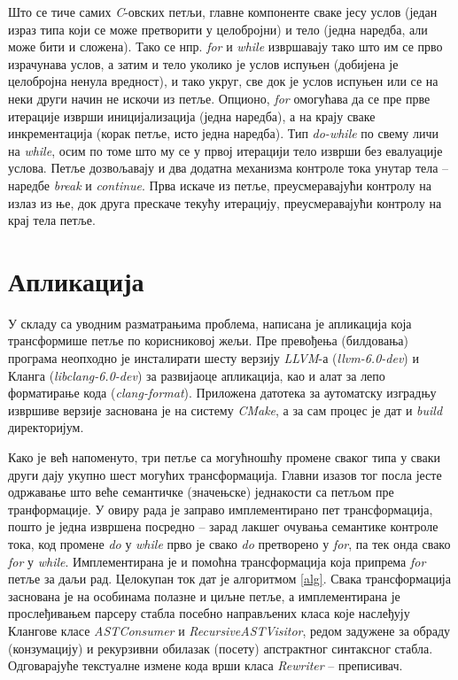 \documentclass[a4paper]{article}
\begin{document}
Што се тиче самих \textit{C}-овских петљи, главне компоненте сваке јесу услов (један израз типа који се може претворити у целобројни) и тело (једна наредба, али може бити и сложена). Тако се нпр. \textit{for} и \textit{while} извршавају тако што им се прво израчунава услов, а затим и тело уколико је услов испуњен (добијена је целобројна ненула вредност), и тако укруг, све док је услов испуњен или се на неки други начин не искочи из петље. Опционо, \textit{for} омогућава да се пре прве итерације изврши иницијализација (једна наредба), а на крају сваке инкрементација (корак петље, исто једна наредба). Тип \textit{do-while} по свему личи на \textit{while}, осим по томе што му се у првој итерацији тело изврши без евалуације услова. Петље дозвољавају и два додатна механизма контроле тока унутар тела -- наредбе \textit{break} и \textit{continue}. Прва искаче из петље, преусмеравајући контролу на излаз из ње, док друга прескаче текућу итерацију, преусмеравајући контролу на крај тела петље.

\section{Апликација}

У складу са уводним разматрањима проблема, написана је апликација која трансформише петље по корисниковој жељи. Пре превођења (билдовања) програма неопходно је инсталирати шесту верзију \textit{LLVM}-а (\textit{llvm-6.0-dev}) и Кланга (\textit{libclang-6.0-dev}) за развијаоце апликација, као и алат за лепо форматирање кода (\textit{clang-format}). Приложена датотека за аутоматску изградњу извршиве верзије заснована је на систему \textit{CMake}, а за сам процес је дат и \textit{build} директоријум.

Како је већ напоменуто, три петље са могућношћу промене сваког типа у сваки други дају укупно шест могућих трансформација. Главни изазов тог посла јесте одржавање што веће семантичке (значењске) једнакости са петљом пре транформације. У овиру рада је заправо имплементирано пет трансформација, пошто је једна извршена посредно -- зарад лакшег очувања семантике контроле тока, код промене \textit{do} у \textit{while} прво је свако \textit{do} претворено у \textit{for}, па тек онда свако \textit{for} у \textit{while}. Имплементирана је и помоћна трансформација која припрема \textit{for} петље за даљи рад. Целокупан ток дат је алгоритмом \ref{alg}. Свака трансформација заснована је на особинама полазне и циљне петље, а имплементирана је прослеђивањем парсеру стабла посебно направљених класа које наслеђују Клангове класе \textit{ASTConsumer} и \textit{RecursiveASTVisitor}, редом задужене за обраду (конзумацију) и рекурзивни обилазак (посету) апстрактног синтаксног стабла. Одговарајуће текстуалне измене кода врши класа \textit{Rewriter} -- преписивач.
\end{document}
